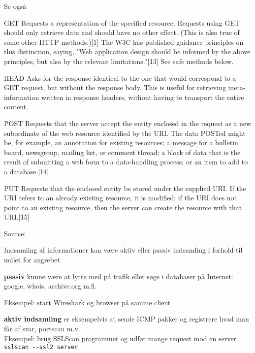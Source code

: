 \documentclass[Screen16to9,17pt]{foils}
\begin{document}
Se også 


\begin{list2}
\item [GET]{\small
Requests a representation of the specified resource. Requests using GET should only retrieve data and should have no other effect. (This is also true of some other HTTP methods.)[1] The W3C has published guidance principles on this distinction, saying, "Web application design should be informed by the above principles, but also by the relevant limitations."[13] See safe methods below.}
\item [HEAD]{\small
Asks for the response identical to the one that would correspond to a GET request, but without the response body. This is useful for retrieving meta-information written in response headers, without having to transport the entire content.}
\item [POST]{\small
Requests that the server accept the entity enclosed in the request as a new subordinate of the web resource identified by the URI. The data POSTed might be, for example, an annotation for existing resources; a message for a bulletin board, newsgroup, mailing list, or comment thread; a block of data that is the result of submitting a web form to a data-handling process; or an item to add to a database.[14]}
\item [PUT]{\small
Requests that the enclosed entity be stored under the supplied URI. If the URI refers to an already existing resource, it is modified; if the URI does not point to an existing resource, then the server can create the resource with that URI.[15]}
\end{list2}

Source: 



\begin{list1}
\item Indsamling af informationer kan være aktiv eller passiv indsamling i forhold
  til målet for angrebet
\item {\bf passiv} kunne være at lytte med på trafik eller søge i databaser
  på Internet: google, whois, archive.org m.fl.

Eksempel: start Wireshark og browser på samme client

\vskip 1cm
\item {\bf aktiv indsamling} er eksempelvis at sende ICMP pakker og
  registrere hvad man får af svar, portscan m.v.\\

Eksempel: brug SSLScan programmet og udfør mange request mod en server\\
\verb+sslscan --ssl2 server+
\end{list1}
\end{document}
